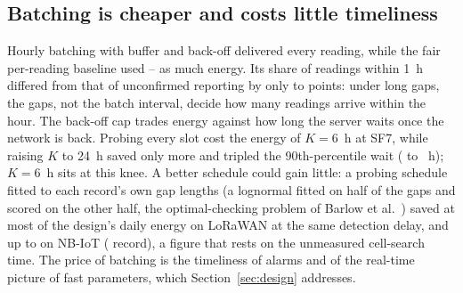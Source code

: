 \subsection{Batching is cheaper and costs little timeliness}
\label{sec:hand-batch}
Hourly batching with buffer and back-off delivered every reading, while the fair per-reading baseline used \batchSaveMin--\batchSaveMax{} as much energy. Its share of readings within 1~h differed from that of unconfirmed reporting by only \batchWithinMin{} to \batchWithinMax{} points: under long gaps, the gaps, not the batch interval, decide how many readings arrive within the hour. The back-off cap trades energy against how long the server waits once the network is back. Probing every slot cost \kEverySlotSeven{} the energy of $K=6$~h at SF7, while raising $K$ to 24~h saved only \kSixToDaySave{} more and tripled the 90th-percentile wait (\kPninetySix{} to \kPninetyDay~h); $K=6$~h sits at this knee. A better schedule could gain little: a probing schedule fitted to each record's own gap lengths (a lognormal fitted on half of the gaps and scored on the other half, the optimal-checking problem of Barlow et al.~\cite{barlow1963optimum}) saved at most \probeSaveLoraMax{} of the design's daily energy on LoRaWAN at the same detection delay, and up to \probeSaveNbMax{} on NB-IoT (\probeSaveNbRecord{} record), a figure that rests on the unmeasured cell-search time. The price of batching is the timeliness of alarms and of the real-time picture of fast parameters, which Section~\ref{sec:design} addresses.

